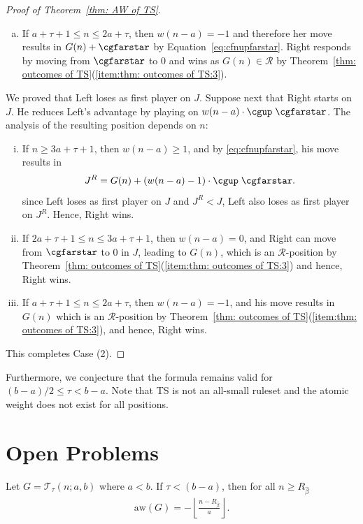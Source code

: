 \documentclass[oneside,reqno]{amsart}
\newcommand{\ts}{\mathcal{T}}
\newcommand{\aw}{\mathrm{aw}}
\newcommand{\rp}{\mathscr{R}}
\newcommand{\hbeta}{\widehat\beta}
\begin{document}
\begin{proof}[Proof of Theorem~\ref{thm: AW of TS}]
\begin{enumerate}[(a)]
        \item\label{item:left play on up:1} If $a+\tau+1\le n\le 2a+\tau$, then $w(n-a)=-1$ and therefore her move results in $G(n)+\cgfarstar$ by Equation~\eqref{eq:cfnupfarstar}. Right responds by moving from $\cgfarstar$ to $0$ and wins as $G(n)\in \rp$ by Theorem~\ref{thm: outcomes of TS}(\ref{item:thm: outcomes of TS:3}).
    \end{enumerate}
    
    We proved that Left loses as first player on $J$. Suppose next that Right starts on $J$. He reduces Left's advantage by playing on $w(n-a)\cdot\cgup\;\cgfarstar$. The analysis of the resulting position depends on $n$:
    \begin{enumerate}[(i)]
        \item If $n\ge 3a+\tau+1$, then $w(n-a)\ge 1$, and by \eqref{eq:cfnupfarstar}, his move results in $$J^R=G(n)+(w(n-a)-1)\cdot\cgup\;\cgfarstar.$$ since Left loses as first player on $J$ and $J^R<J$, Left also loses as first player on $J^R$. Hence, Right wins.
        \item If $2a+\tau+1\le n\le 3a+\tau+1$, then $w(n-a)=0$, and Right can move from $\cgfarstar$ to 0 in $J$, leading to $G(n)$, which is an $\rp$-position by Theorem~\ref{thm: outcomes of TS}(\ref{item:thm: outcomes of TS:3}) and hence, Right wins.
        \item If $a+\tau+1\le n\le 2a+\tau$, then $w(n-a)=-1$, and his move results in $G(n)$ which is an $\rp$-position by Theorem~\ref{thm: outcomes of TS}(\ref{item:thm: outcomes of TS:3}), and hence, Right wins.
    \end{enumerate}This completes Case (2).
\end{proof}

Furthermore, we conjecture that the formula remains valid for $(b-a)/2\le\tau<b-a$. Note that {\sc TS} is not an all-small ruleset and the atomic weight does not exist for all positions. 



\section{Open Problems}
\begin{conjecture}\label{con: AW of TS for all k<b-a}
    Let $G=\ts_\tau(n;a,b)$ where $a<b$. If $\tau< (b-a)$, then for all $n\ge R_{\hbeta}$
    \begin{align}
    \aw(G)=-\left\lfloor \frac{n-R_{\hbeta}}{a}\right\rfloor.
    \end{align}
\end{conjecture}
\end{document}
